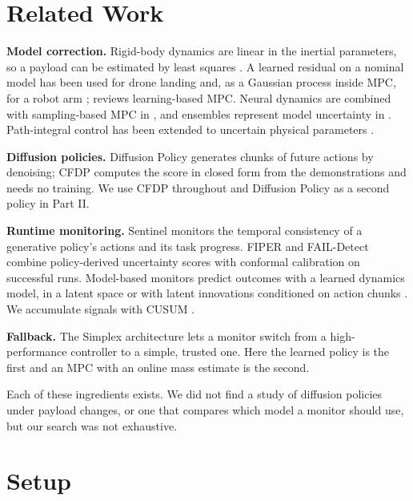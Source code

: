 \documentclass[conference]{IEEEtran}
\begin{document}
\section{Related Work}

\textbf{Model correction.} Rigid-body dynamics are linear in the inertial parameters, so a payload can be estimated by least squares \cite{atkeson1986estimation}. A learned residual on a nominal model has been used for drone landing \cite{shi2019neural} and, as a Gaussian process inside MPC, for a robot arm \cite{carron2019data}; \cite{hewing2020learning} reviews learning-based MPC. Neural dynamics are combined with sampling-based MPC in \cite{nagabandi2018neural}, and ensembles represent model uncertainty in \cite{chua2018deep}. Path-integral control \cite{williams2017model} has been extended to uncertain physical parameters \cite{abraham2020model}.

\textbf{Diffusion policies.} Diffusion Policy \cite{chi2023diffusion} generates chunks of future actions by denoising; CFDP \cite{mishra2026cfdp} computes the score in closed form from the demonstrations and needs no training. We use CFDP throughout and Diffusion Policy as a second policy in Part II.

\textbf{Runtime monitoring.} Sentinel \cite{agia2024sentinel} monitors the temporal consistency of a generative policy's actions and its task progress. FIPER \cite{romer2025fiper} and FAIL-Detect \cite{xu2025faildetect} combine policy-derived uncertainty scores with conformal calibration \cite{angelopoulos2021gentle} on successful runs. Model-based monitors predict outcomes with a learned dynamics model, in a latent space \cite{liu2023momo} or with latent innovations conditioned on action chunks \cite{zhou2026patch}. We accumulate signals with CUSUM \cite{page1954cusum}.

\textbf{Fallback.} The Simplex architecture \cite{sha2001simplex} lets a monitor switch from a high-performance controller to a simple, trusted one. Here the learned policy is the first and an MPC with an online mass estimate is the second.

Each of these ingredients exists. We did not find a study of diffusion policies under payload changes, or one that compares which model a monitor should use, but our search was not exhaustive.

\section{Setup}
\label{sec:setup}
\end{document}
